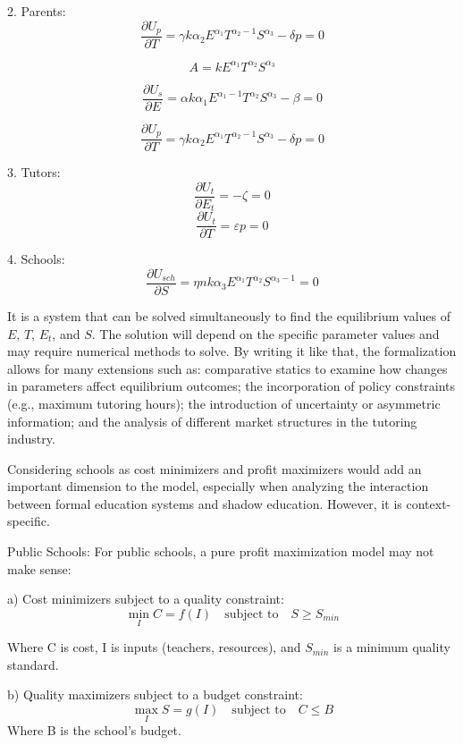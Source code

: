 \documentclass[12pt,a4paper,onecolumn]{article}
\numberwithin{equation}{section}
\begin{document}
2. Parents:
\[
\frac{\partial U_p}{\partial T} = \gamma k\alpha_2 E^{\alpha_1}T^{\alpha_2-1}S^{\alpha_3} - \delta p = 0
\]

\begin{equation}
    A = kE^{\alpha_1} T^{\alpha_2} S^{\alpha_3}
\end{equation}

\begin{equation}
    \frac{\partial U_s}{\partial E} = \alpha k \alpha_1 E^{\alpha_1-1} T^{\alpha_2} S^{\alpha_3} - \beta = 0
\end{equation}

\begin{equation}
    \frac{\partial U_p}{\partial T} = \gamma k \alpha_2 E^{\alpha_1} T^{\alpha_2-1} S^{\alpha_3} - \delta p = 0
\end{equation}

3. Tutors:
\[
\frac{\partial U_t}{\partial E_t} = -\zeta = 0
\]
\[
\frac{\partial U_t}{\partial T} = \varepsilon p = 0
\]

4. Schools:
\[
\frac{\partial U_{sch}}{\partial S} = \eta n k\alpha_3 E^{\alpha_1}T^{\alpha_2}S^{\alpha_3-1} = 0
\]

It is a system that can be solved simultaneously to find the equilibrium values of $E$, $T$, $E_t$, and $S$. The solution will depend on the specific parameter values and may require numerical methods to solve. By writing it like that, the formalization allows for many extensions such as: comparative statics to examine how changes in parameters affect equilibrium outcomes; the incorporation of policy constraints (e.g., maximum tutoring hours); the introduction of uncertainty or asymmetric information; and the analysis of different market structures in the tutoring industry.

Considering schools as cost minimizers and profit maximizers would add an important dimension to the model, especially when analyzing the interaction between formal education systems and shadow education. However, it is context-specific.

Public Schools:
For public schools, a pure profit maximization model may not make sense:

a) Cost minimizers subject to a quality constraint:
\[
\min_{I} C = f(I) \quad \text{subject to} \quad S \geq S_{min}
\]

Where C is cost, I is inputs (teachers, resources), and $S_{min}$ is a minimum quality standard.

b) Quality maximizers subject to a budget constraint:
\[
\max_{I} S = g(I) \quad \text{subject to} \quad C \leq B
\]
Where B is the school's budget.
\end{document}
